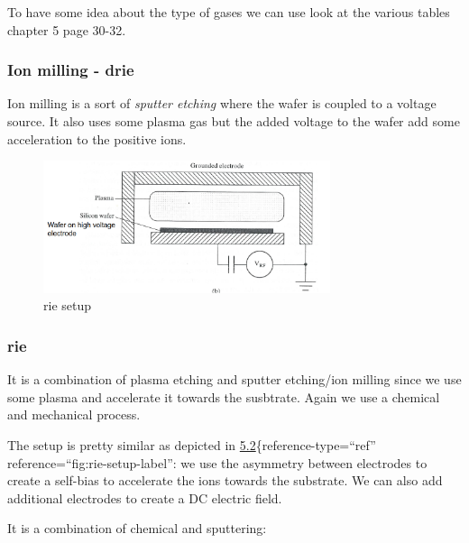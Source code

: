 \documentclass[
]{article}
\begin{document}
To have some idea about the type of gases we can use look at the various
tables chapter 5 page 30-32.

\hypertarget{ion-milling---drie}{%
\subsubsection{\texorpdfstring{Ion milling -
{drie}}{Ion milling - drie}}\label{ion-milling---drie}}

Ion milling is a sort of \emph{sputter etching} where the wafer is
coupled to a voltage source. It also uses some plasma gas but the added
voltage to the wafer add some acceleration to the positive ions.

\begin{figure}
\hypertarget{fig:rie-setup-label}{%
\centering
\includegraphics[width=0.75\textwidth,height=\textheight]{rie_setup.png}
\caption{{rie} setup}\label{fig:rie-setup-label}
}
\end{figure}

\hypertarget{rie}{%
\subsubsection{\texorpdfstring{{rie}}{rie}}\label{rie}}

It is a combination of plasma etching and sputter etching/ion milling
since we use some plasma and accelerate it towards the susbtrate. Again
we use a chemical and mechanical process.

The setup is pretty similar as depicted in
\protect\hyperlink{fig:rie-setup-label}{5.2}\{reference-type=``ref''
reference=``fig:rie-setup-label'': we use the asymmetry between
electrodes to create a self-bias to accelerate the ions towards the
substrate. We can also add additional electrodes to create a DC electric
field.

It is a combination of chemical and sputtering:
\end{document}
